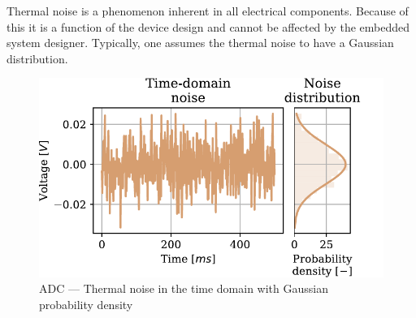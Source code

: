 Thermal noise is a phenomenon inherent in all electrical components. Because of this it is a function of the device design and cannot be affected by the embedded system designer. Typically, one assumes the thermal noise to have a Gaussian distribution.

\begin{figure}
  \centering
  \includegraphics[scale=0.72]{figures/electronics/adc/plot_thermerr}
  \caption[ADC thermal noise]{ADC --- Thermal noise in the time domain with Gaussian probability density~\cite{hall2020fund}%
    \label{fig:plot_themerr}}
\end{figure}
